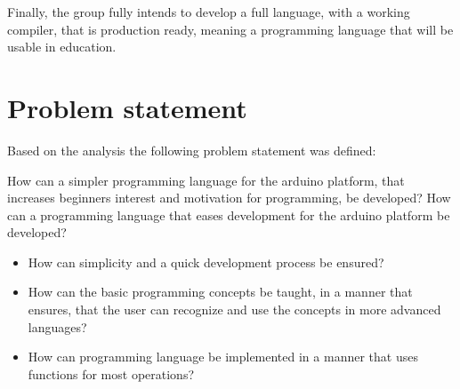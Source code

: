 Finally, the group fully intends to develop a full language, with a working compiler, that is production ready, meaning a programming language that will be usable in education.

\section{Problem statement}
Based on the analysis the following problem statement was defined:
\begin{center}
	How can a simpler programming language for the arduino platform, that increases beginners interest and motivation for programming, be developed?
	How can a programming language that eases development for the arduino platform be developed?

\begin{itemize}
	\item How can simplicity and a quick development process be ensured? %
	\item How can the basic programming concepts be taught, in a manner that ensures, that the user can recognize and use the concepts in more advanced languages?
	\item How can programming language be implemented in a manner that uses functions for most operations? 
\end{itemize}
\end{center}

 